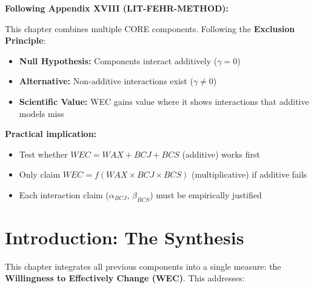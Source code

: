 \begin{tcolorbox}[colback=red!5!white, colframe=red!75!black,
    title=\textbf{Methodological Note: The Exclusion Principle (Appendix XVIII)}]
\textbf{Following Appendix XVIII (LIT-FEHR-METHOD):}

This chapter combines multiple CORE components. Following the \textbf{Exclusion Principle}:
\begin{itemize}[nosep]
    \item \textbf{Null Hypothesis:} Components interact additively ($\gamma = 0$)
    \item \textbf{Alternative:} Non-additive interactions exist ($\gamma \neq 0$)
    \item \textbf{Scientific Value:} WEC gains value where it shows interactions that additive models miss
\end{itemize}

\textbf{Practical implication:}
\begin{itemize}[nosep]
    \item Test whether $WEC = WAX + BCJ + BCS$ (additive) works first
    \item Only claim $WEC = f(WAX \times BCJ \times BCS)$ (multiplicative) if additive fails
    \item Each interaction claim ($\alpha_{BCJ}$, $\beta_{BCS}$) must be empirically justified
\end{itemize}
\end{tcolorbox}

\section{Introduction: The Synthesis}

This chapter integrates all previous components into a single measure:
the \textbf{Willingness to Effectively Change (WEC)}. This addresses:

\begin{center}
\end{center}

